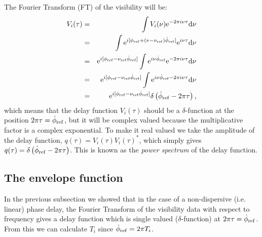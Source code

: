 \documentclass{tufte-handout}
\begin{document}

\noindent
The Fourier Transform (FT) of the visibility will be:
%
\begin{eqnarray}
\nonumber V_i(\tau) &=& \int{V_i(\nu){\rm e}^{-2\pi i\nu\tau} {\rm d}\nu} \\
\nonumber &=& \int{{\rm e}^{i[\phi_{\rm ref} + (\nu - \nu_{\rm ref}) \dot{\phi}_{\rm ref}]}{\rm e}^{i\nu\tau} {\rm d}\nu } \\
\nonumber &=& {\rm e}^{i[\phi_{\rm ref} - \nu_{\rm ref} \dot{\phi}_{\rm ref}]} \int{{\rm e}^{i\nu \dot{\phi}_{\rm ref}}{\rm e}^{-2\pi i\nu\tau} {\rm d}\nu } \\
\nonumber &=& {\rm e}^{i[\phi_{\rm ref} - \nu_{\rm ref} \dot{\phi}_{\rm ref}]} \int{{\rm e}^{i\nu \dot{\phi}_{\rm ref} - 2\pi i\nu\tau} {\rm d}\nu } \\
 &=& {\rm e}^{i[\phi_{\rm ref} - \nu_{\rm ref} \dot{\phi}_{\rm ref}]} \delta \left( \dot{\phi}_{\rm ref} - 2\pi \tau \right), 
\end{eqnarray}
%
which means that the delay function $V_i(\tau)$ should be a $\delta$-function at the position $2\pi\tau = \dot{\phi}_{\rm ref}$, but it will be complex valued because the multiplicative factor is a complex exponential. To make it real valued we take the amplitude of the delay function, $q(\tau) = V_i(\tau)V_i(\tau)^{\ast}$, which simply gives $q(\tau) = \delta \left( \dot{\phi}_{\rm ref} - 2\pi \tau \right)$. This is known as the \emph{power spectrum} of the delay function.

\subsection{The envelope function}

In the previous subsection we showed that in the case of a non-dispersive (i.e. linear) phase delay, the Fourier Transform of the visibility data with respect to frequency gives a delay function which is single valued ($\delta$-function) at $2\pi\tau = \dot{\phi}_{\rm ref}$. From this we can calculate $T_i$ since $\dot{\phi}_{\rm ref} = 2\pi T_i$. 
\end{document}

